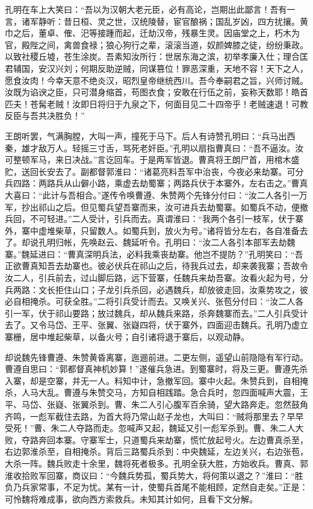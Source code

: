 孔明在车上大笑曰：“吾以为汉朝大老元臣，必有高论，岂期出此鄙言！吾有一言，诸军静听：昔日桓、灵之世，汉统陵替，宦官酿祸；国乱岁凶，四方扰攘。黄巾之后，董卓、傕、汜等接踵而起，迁劫汉帝，残暴生灵。因庙堂之上，朽木为官，殿陛之间，禽兽食禄；狼心狗行之辈，滚滚当道，奴颜婢膝之徒，纷纷秉政。以致社稷丘墟，苍生涂炭。吾素知汝所行：世居东海之滨，初举孝廉入仕；理合匡君辅国，安汉兴刘；何期反助逆贼，同谋篡位！罪恶深重，天地不容！天下之人，愿食汝肉！今幸天意不绝炎汉，昭烈皇帝继统西川。吾今奉嗣君之旨，兴师讨贼。汝既为谄谀之臣，只可潜身缩首，苟图衣食；安敢在行伍之前，妄称天数耶！皓首匹夫！苍髯老贼！汝即日将归于九泉之下，何面目见二十四帝乎！老贼速退！可教反臣与吾共决胜负！”

王朗听罢，气满胸膛，大叫一声，撞死于马下。后人有诗赞孔明曰：“兵马出西秦，雄才敌万人。轻摇三寸舌，骂死老奸臣。”孔明以扇指曹真曰：“吾不逼汝。汝可整顿军马，来日决战。”言讫回车。于是两军皆退。曹真将王朗尸首，用棺木盛贮，送回长安去了。副都督郭淮曰：“诸葛亮料吾军中治丧，今夜必来劫寨。可分兵四路：两路兵从山僻小路，乘虚去劫蜀寨；两路兵伏于本寨外，左右击之。”曹真大喜曰：“此计与吾相合。”遂传令唤曹遵、朱赞两个先锋分付曰：“汝二人各引一万军，抄出祁山之后。但见蜀兵望吾寨而来，汝可进兵去劫蜀寨。如蜀兵不动，便撤兵回，不可轻进。”二人受计，引兵而去。真谓淮曰：“我两个各引一枝军，伏于寨外，寨中虚堆柴草，只留数人。如蜀兵到，放火为号。”诸将皆分左右，各自准备去了。却说孔明归帐，先唤赵云、魏延听令。孔明曰：“汝二人各引本部军去劫魏寨。”魏延进曰：“曹真深明兵法，必料我乘丧劫寨。他岂不提防？”孔明笑曰：“吾正欲曹真知吾去劫寨也。彼必伏兵在祁山之后，待我兵过去，却来袭我寨；吾故令汝二人，引兵前去，过山脚后路，远下营寨，任魏兵来劫吾寨。汝看火起为号，分兵两路：文长拒住山口；子龙引兵杀回，必遇魏兵，却放彼走回，汝乘势攻之，彼必自相掩杀。可获全胜。”二将引兵受计而去。又唤关兴、张苞分付曰：“汝二人各引一军，伏于祁山要路；放过魏兵，却从魏兵来路，杀奔魏寨而去。”二人引兵受计去了。又令马岱、王平、张翼、张嶷四将，伏于寨外，四面迎击魏兵。孔明乃虚立寨栅，居中堆起柴草，以备火号；自引诸将退于寨后，以观动静。

却说魏先锋曹遵、朱赞黄昏离寨，迤逦前进。二更左侧，遥望山前隐隐有军行动。曹遵自思曰：“郭都督真神机妙算！”遂催兵急进。到蜀寨时，将及三更。曹遵先杀入寨，却是空寨，并无一人。料知中计，急撤军回。寨中火起。朱赞兵到，自相掩杀，人马大乱。曹遵与朱赞交马，方知自相践踏。急合兵时，忽四面喊声大震，王平、马岱、张嶷、张翼杀到。曹、朱二人引心腹军百余骑，望大路奔走。忽然鼓角齐鸣，一彪军截住去路，为首大将乃常山赵子龙也，大叫曰：“贼将那里去？早早受死！”曹、朱二人夺路而走。忽喊声又起，魏延又引一彪军杀到。曹、朱二人大败，夺路奔回本寨。守寨军士，只道蜀兵来劫寨，慌忙放起号火。左边曹真杀至，右边郭淮杀至，自相掩杀。背后三路蜀兵杀到：中央魏延，左边关兴，右边张苞，大杀一阵。魏兵败走十余里，魏将死者极多。孔明全获大胜，方始收兵。曹真、郭淮收拾败军回寨，商议曰：“今魏兵势孤，蜀兵势大，将何策以退之？”淮曰：“胜负乃兵家常事，不足为忧。某有一计，使蜀兵首尾不能相顾，定然自走矣。”正是：可怜魏将难成事，欲向西方索救兵。未知其计如何，且看下文分解。
